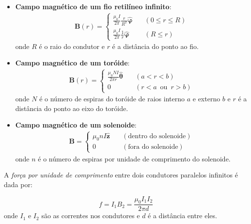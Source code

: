 \documentclass{article}
\begin{document}
\begin{itemize}
    \item [(a)] \textbf{Campo magnético de um fio retilíneo infinito}:\\
        \begin{align}
                \boxed{\mathbf{B}(r) = \begin{cases}
                    \frac{\mu_0 I}{2\pi} \frac{r}{R^2} \hat{\boldsymbol{\varphi}} \quad &(0 \leq r \leq R) \\
                    \frac{\mu_0 I}{2\pi} \frac{1}{r} \hat{\boldsymbol{\varphi}} \quad &(R \leq r)
                \end{cases}}
        \end{align} onde \(R\) é o raio do condutor e \(r\) é a distância do ponto ao fio.

    \item [(b)] \textbf{Campo magnético de um toróide}:
        \begin{align}
            \boxed{\mathbf{B}(r) = \begin{cases}
            		\frac{\mu_0 N I}{2\pi r}\hat{\boldsymbol{\theta}} \quad &(a < r < b) \\
            		0 \quad &(r < a \,\text{ ou }\, r > b)
            	\end{cases}}
        \end{align} onde \(N\) é o número de espiras do toróide de raios interno \(a\) e externo \(b\) e \(r\) é a distância do ponto ao eixo do toróide.

    \item [(c)] \textbf{Campo magnético de um solenoide}:
        \begin{align}
            \boxed{\mathbf{B} = \begin{cases}
            		\mu_0 n I\hat{\mathbf{z}} \quad &(\text{dentro do solenoide}) \\
            		0 \quad &(\text{fora do solenoide})
            	\end{cases}}
        \end{align} onde \(n\) é o número de espiras por unidade de comprimento do solenoide.
\end{itemize}

A \emph{força por unidade de comprimento} entre dois condutores paralelos infinitos é dada por:

\begin{equation}
    \boxed{f = I_1 B_2 = \frac{\mu_0 I_1 I_2}{2\pi d}}
\end{equation} onde \(I_1\) e \(I_2\) são as correntes nos condutores e \(d\) é a distância entre eles.
\end{document}
